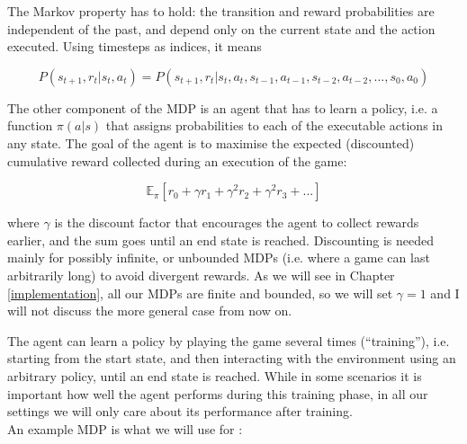 The Markov property has to hold: the transition and reward probabilities are independent of the past, and depend only on the current state and the action executed. Using timesteps as indices, it means

\begin{equation} \label{eq:MarkovProperty}
    P(s_{t+1},r_{t} | s_{t}, a_{t}) = P(s_{t+1},r_{t} | s_{t}, a_{t}, s_{t-1}, a_{t-1}, s_{t-2}, a_{t-2}, ..., s_{0}, a_{0})
\end{equation}


The other component of the MDP is an agent that has to learn a policy, i.e. a function $\pi(a|s)$ that assigns probabilities to each of the executable actions in any state. The goal of the agent is to maximise the expected (discounted) cumulative reward collected during an execution of the game:

\begin{equation}\label{eq:cumReward}
\mathbb{E}_{\pi}[r_{0} + \gamma r_{1} + \gamma^2 r_{2} + \gamma^2 r_{3} + ...]
\end{equation}

where $\gamma$ is the discount factor that encourages the agent to collect rewards earlier, and the sum goes until an end state is reached. Discounting is needed mainly for possibly infinite, or unbounded MDPs (i.e. where a game can last arbitrarily long) to avoid divergent rewards. As we will see in Chapter \ref{implementation}, all our MDPs are finite and bounded, so we will set $\gamma=1$ and I will not discuss the more general case from now on.


The agent can learn a policy by playing the game several times (``training''), i.e. starting from the start state, and then interacting with the environment using an arbitrary policy, until an end state is reached. While in some scenarios it is important how well the agent performs during this training phase, in all our settings we will only care about its performance after training.\\

An example MDP is what we will use for \TwoThinning:

